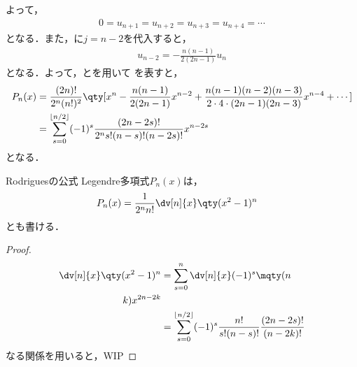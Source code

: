 \documentclass{report}
\begin{document}
      よって，
      \begin{align}
        0 = u_{n + 1} = u_{n + 2} = u_{n + 3} = u_{n + 4} = \cdots 
      \end{align}
      となる．また，に$j = n - 2$を代入すると，
      \begin{align}
        u_{n - 2} = -\frac{n(n - 1)}{2(2n - 1)}u_n\label{legendre-polynominal-u-expantion-recurr-2}
      \end{align}
      となる．よって，とを用いて
      を表すと，
      \begin{align}
        P_n(x) &= \frac{(2n)!}{2^n(n!)^2}\qty[x^n - \frac{n(n - 1)}{2(2n - 1)}x^{n - 2} + \frac{n(n - 1)(n - 2)(n - 3)}{2\cdot 4\cdot (2n - 1)(2n - 3)}x^{n - 4} + \cdots] \\ 
        &= \sum_{s = 0}^{\lfloor n/2 \rfloor}(-1)^s \frac{(2n - 2s)!}{2^ns!(n - s)!(n - 2s)!}x^{n - 2s}
      \end{align}
      となる．
      \begin{myprop}{Rodriguesの公式}{}
        Legendre多項式$P_n(x)$は，
        \begin{align}
          P_n(x) &= \frac{1}{2^nn!}\dv[n]{x}\qty(x^2 - 1)^n\label{legendre-pn-easy}
        \end{align}
        とも書ける．
        \tcblower
        \begin{proof}
          \begin{align}
            \dv[n]{x}\qty(x^2 - 1)^n &= \sum_{s = 0}^{n}\dv[n]{x}(-1)^s\mqty(n \\ k)x^{2n - 2k} \\ 
            &= \sum_{s = 0}^{\lfloor n/2 \rfloor}(-1)^s\frac{n!}{s!(n - s)!}\frac{(2n - 2s)!}{(n - 2k)!}
          \end{align}
          なる関係を用いると，WIP
        \end{proof}
      \end{myprop}
\end{document}
